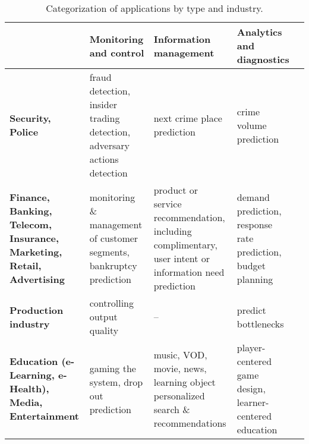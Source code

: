 \documentclass{llncs}
\begin{document}
\begin{table} [h]
\centering
\caption{Categorization of applications by type and industry.}
  \begin{tabular}{|P{2.31cm}|*{4}{P{3.0cm}|}}\hline

    &{\textbf{Monitoring and control}}
    &{\textbf{Information management}}%
    &{\textbf{Analytics and diagnostics}}
		\\\hline

    \textbf{Security, Police}
    &fraud detection, insider trading detection, adversary actions detection
    &next crime place prediction
    &crime volume prediction
    \\\hline

    \textbf{Finance, Banking, Telecom, Insurance, Marketing, Retail, Advertising}	
    &monitoring \& management of customer segments, bankruptcy prediction	
    &product or service recommendation, including complimentary, user intent or information need prediction	
    &demand prediction, response rate prediction, budget planning	
    \\\hline

    \textbf{Production industry}
    &controlling output quality
    &--
    &predict bottlenecks
    \\\hline

    \textbf{Education (e-Learning, e-Health), Media, Entertainment}
    &gaming the system, drop out prediction	
    &music, VOD, movie, news, learning object personalized search \& recommendations
    &player-centered game design, learner-centered education	
    \\\hline
  \end{tabular}
\label{tab:industries}
\end{table}
\end{document}
